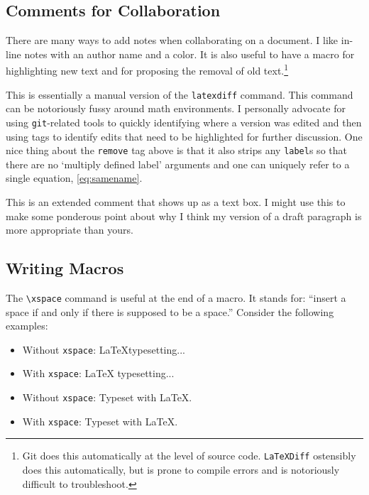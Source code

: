 \subsection{Comments for Collaboration}

There are many ways to add notes when collaborating on a document. I like in-line notes with an author name and a color.   It is also useful to have a macro for highlighting new text and for proposing the removal of old text.\footnote{Git does this automatically at the level of source code. \texttt{LaTeXDiff} ostensibly does this automatically, but is prone to compile errors and is notoriously difficult to troubleshoot.}



This is essentially a manual version of the \texttt{latexdiff} command. This command can be notoriously fussy around math environments. I personally advocate for using \texttt{git}-related tools to quickly identifying where a version was edited and then using tags to identify edits that need to be highlighted for further discussion. One nice thing about the \texttt{remove} tag above is that it also strips any \texttt{label}s so that there are no `multiply defined label' arguments and one can uniquely refer to a single equation, \eqref{eq:samename}.

\begin{flipcomment}
This is an extended comment that shows up as a text box. I might use this to make some ponderous point about why I think my version of a draft paragraph is more appropriate than yours.
\end{flipcomment}


\subsection{Writing Macros}

The \verb!\xspace! command is useful at the end of a macro. It stands for: ``insert a space if and only if there is supposed to be a space.'' Consider the following examples:
\begin{itemize}
	\item Without \texttt{xspace}: \LaTeX typesetting...
	\item With \texttt{xspace}: \LaTeX\xspace typesetting...
	\item Without \texttt{xspace}: Typeset with \LaTeX.
	\item With \texttt{xspace}: Typeset with \LaTeX\xspace.
\end{itemize}



